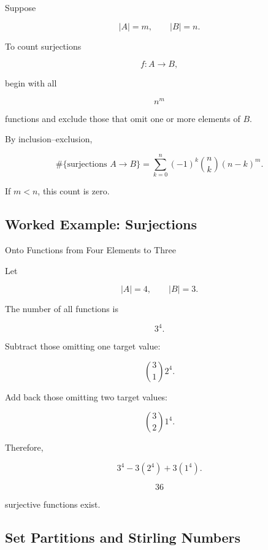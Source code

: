 Suppose

\[
|A|=m,
\qquad
|B|=n.
\]

To count surjections

\[
f:A\to B,
\]

begin with all

\[
n^m
\]

functions and exclude those that omit one or more elements of \(B\).

By inclusion--exclusion,

\[
\boxed{
\#\{\text{surjections }A\to B\}
=
\sum_{k=0}^{n}
(-1)^k
\binom{n}{k}
(n-k)^m.
}
\]

If \(m<n\), this count is zero.

\subsection{Worked Example: Surjections}
\label{subsec:worked-surjections}

\begin{workedexamplebox}{Onto Functions from Four Elements to Three}

Let

\[
|A|=4,
\qquad
|B|=3.
\]

The number of all functions is

\[
3^4.
\]

Subtract those omitting one target value:

\[
\binom31 2^4.
\]

Add back those omitting two target values:

\[
\binom32 1^4.
\]

Therefore,

\[
3^4-3(2^4)+3(1^4).
\]

\begin{answerbox}
\[
\boxed{
36
}
\]

surjective functions exist.
\end{answerbox}

\end{workedexamplebox}

\subsection{Set Partitions and Stirling Numbers}
\label{subsec:set-partitions-stirling-preview}


